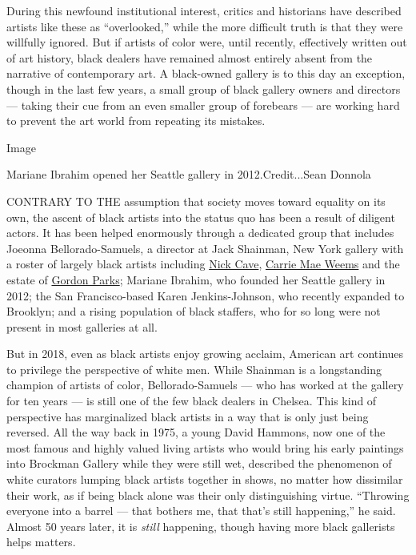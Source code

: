 During this newfound institutional interest, critics and historians have
described artists like these as ``overlooked,'' while the more difficult
truth is that they were willfully ignored. But if artists of color were,
until recently, effectively written out of art history, black dealers
have remained almost entirely absent from the narrative of contemporary
art. A black-owned gallery is to this day an exception, though in the
last few years, a small group of black gallery owners and directors ---
taking their cue from an even smaller group of forebears --- are working
hard to prevent the art world from repeating its mistakes.

Image

Mariane Ibrahim opened her Seattle gallery in 2012.Credit...Sean Donnola

CONTRARY TO THE assumption that society moves toward equality on its
own, the ascent of black artists into the status quo has been a result
of diligent actors. It has been helped enormously through a dedicated
group that includes Joeonna Bellorado-Samuels, a director at Jack
Shainman, New York gallery with a roster of largely black artists
including \href{http://www.jackshainman.com/artists/nick-cave/}{Nick
Cave}, \href{http://carriemaeweems.net/}{Carrie Mae Weems} and the
estate of \href{http://www.gordonparksfoundation.org/}{Gordon Parks};
Mariane Ibrahim, who founded her Seattle gallery in 2012; the San
Francisco-based Karen Jenkins-Johnson, who recently expanded to
Brooklyn; and a rising population of black staffers, who for so long
were not present in most galleries at all.

But in 2018, even as black artists enjoy growing acclaim, American art
continues to privilege the perspective of white men. While Shainman is a
longstanding champion of artists of color, Bellorado-Samuels --- who has
worked at the gallery for ten years --- is still one of the few black
dealers in Chelsea. This kind of perspective has marginalized black
artists in a way that is only just being reversed. All the way back in
1975, a young David Hammons, now one of the most famous and highly
valued living artists who would bring his early paintings into Brockman
Gallery while they were still wet, described the phenomenon of white
curators lumping black artists together in shows, no matter how
dissimilar their work, as if being black alone was their only
distinguishing virtue. ``Throwing everyone into a barrel --- that
bothers me, that that's still happening,'' he said. Almost 50 years
later, it is \emph{still} happening, though having more black gallerists
helps matters.

